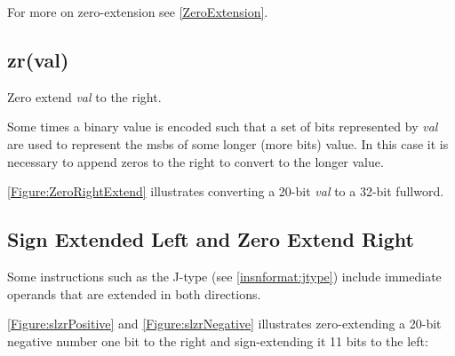 For more on zero-extension see \autoref{ZeroExtension}.


\subsection{zr(val)}
\label{extension:zr}

Zero extend {\em val} to the right.

Some times a binary value is encoded such that a set of bits represented
by {\em val} are used to represent the \acrshort{msb}s of some longer (more bits) 
value.  
In this case it is necessary to append zeros to the right to convert \verb@val@ to 
the longer value.

\autoref{Figure:ZeroRightExtend} illustrates converting a 20-bit {\em val} to
a 32-bit fullword.

\begin{figure}[ht]
\centering
{}
\label{Figure:ZeroRightExtend}
\end{figure}



\subsection{Sign Extended Left and Zero Extend Right}
\label{extension:slzr}

Some instructions such as the J-type (see \autoref{insnformat:jtype}) include
immediate operands that are extended in both directions.

\autoref{Figure:slzrPositive} and \autoref{Figure:slzrNegative}
illustrates zero-extending a 20-bit negative number one bit to the right 
and sign-extending it 11 bits to the left:

\begin{figure}[ht]
\centering
{}
\label{Figure:slzrPositive}
\end{figure}

